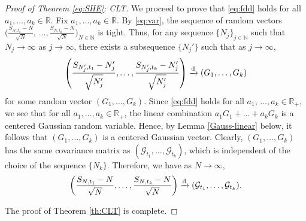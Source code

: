 \documentclass[12pt, reqno]{amsart}
\newcommand{\N}{{\mathbb{N}}}
\newcommand{\R}{{\mathbb{R}}}
\newcommand{\E}{\mathrm{E}}
\renewcommand{\d}{\mathrm{d}}
\newcommand{\<}{\langle}
\renewcommand{\>}{\rangle}
\begin{document}
\begin{proof}[Proof of Theorem \ref{eq:SHE}: CLT]
           
           We proceed to prove that \eqref{eq:fdd} holds for all $a_1, \ldots, a_k\in \R$. 
           Fix $a_1, \ldots, a_k\in \R$. By \eqref{eq:var}, the sequence of random vectors 
           $(\frac{S_{N,t_1}-N}{\sqrt{N}}$, $\ldots, \frac{{S_{N,t_k}-N}}{\sqrt{N}})_{N\in\N}$ is tight. 
           Thus, for any sequence $\{N_j\}_{j\in\N}$ such that $N_j\to \infty$ as $j\to\infty$, there exists a subsequence $\{N_j'\}$ such that 
           as $j\to\infty$,
           \begin{align*}
           \left(\frac{S_{N'_{j},t_1}-N_j'}{\sqrt{N'_{j}}}, \ldots, \frac{S_{N'_{j},t_k}-N_j'}{\sqrt{N'_{j}}}\right) \xrightarrow{\rm d} (G_1, \ldots, G_k)
           \end{align*}
           for some random vector $ (G_1, \ldots, G_k)$. 
           Since \eqref{eq:fdd} holds for all $a_1$, $\ldots, a_k\in \R_+$, we see that for all $a_1, \ldots, a_k\in \R_+$, the linear 
           combination $a_1G_1+\ldots + a_kG_k$ is a centered Gaussian random variable. Hence, by Lemma \ref{Gauss-linear}
           below, it follows that $(G_1, \ldots, G_k)$ is a centered Gaussian vector. Clearly, $(G_1, \ldots, G_k)$ has the same
           covariance matrix as $(\mathcal{G}_{t_1}, \ldots, \mathcal{G}_{t_k})$, which is independent of the choice of the sequence
           $\{N_k\}$. Therefore, we have as $N\to\infty$,
           \begin{align*}
            \left(\frac{S_{N,t_1}-N}{\sqrt{N}}, \ldots, \frac{S_{N,t_k}-N}{\sqrt{N}}\right) \xrightarrow{\rm d}
             (\mathcal{G}_{t_1}, \ldots, \mathcal{G}_{t_k}).
           \end{align*}
           
           The proof of Theorem \ref{th:CLT} is complete.
\end{proof}
\end{document}
